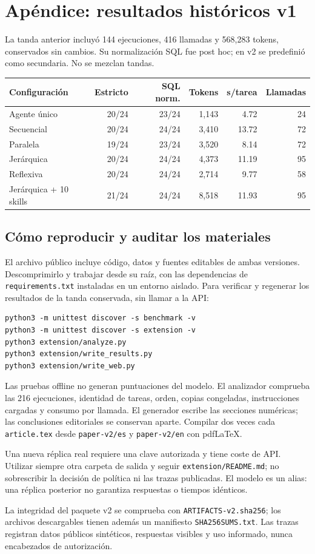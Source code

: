 \clearpage
\section*{Apéndice: resultados históricos v1}
La tanda anterior incluyó 144 ejecuciones, 416 llamadas y 568,283 tokens, conservados sin cambios. Su normalización SQL fue post hoc; en v2 se predefinió como secundaria. No se mezclan tandas.
\begin{center}\small
\setlength{\tabcolsep}{4pt}
\begin{tabularx}{\linewidth}{@{}Xrrrrr@{}}
\toprule Configuración & Estricto & SQL norm. & Tokens & s/tarea & Llamadas \\ \midrule
Agente único & 20/24 & 23/24 & 1,143 & 4.72 & 24 \\
Secuencial & 20/24 & 24/24 & 3,410 & 13.72 & 72 \\
Paralela & 19/24 & 23/24 & 3,520 & 8.14 & 72 \\
Jerárquica & 20/24 & 24/24 & 4,373 & 11.19 & 95 \\
Reflexiva & 20/24 & 24/24 & 2,714 & 9.77 & 58 \\
Jerárquica + 10 skills & 21/24 & 24/24 & 8,518 & 11.93 & 95 \\
\bottomrule
\end{tabularx}\end{center}

\subsection*{Cómo reproducir y auditar los materiales}
El archivo público incluye código, datos y fuentes editables de ambas versiones. Descomprimirlo y trabajar desde su raíz, con las dependencias de \texttt{requirements.txt} instaladas en un entorno aislado. Para verificar y regenerar los resultados de la tanda conservada, sin llamar a la API:
\begin{verbatim}
python3 -m unittest discover -s benchmark -v
python3 -m unittest discover -s extension -v
python3 extension/analyze.py
python3 extension/write_results.py
python3 extension/write_web.py
\end{verbatim}
Las pruebas offline no generan puntuaciones del modelo. El analizador comprueba las 216 ejecuciones, identidad de tareas, orden, copias congeladas, instrucciones cargadas y consumo por llamada. El generador escribe las secciones numéricas; las conclusiones editoriales se conservan aparte. Compilar dos veces cada \texttt{article.tex} desde \texttt{paper-v2/es} y \texttt{paper-v2/en} con pdfLaTeX.

Una nueva réplica real requiere una clave autorizada y tiene coste de API. Utilizar siempre otra carpeta de salida y seguir \texttt{extension/README.md}; no sobrescribir la decisión de política ni las trazas publicadas. El modelo es un alias: una réplica posterior no garantiza respuestas o tiempos idénticos.

La integridad del paquete v2 se comprueba con \texttt{ARTIFACTS-v2.sha256}; los archivos descargables tienen además un manifiesto \texttt{SHA256SUMS.txt}. Las trazas registran datos públicos sintéticos, respuestas visibles y uso informado, nunca encabezados de autorización.
